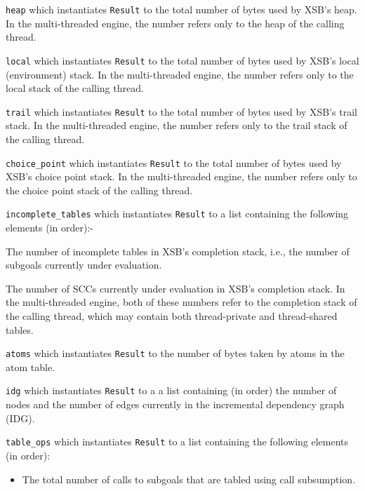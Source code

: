 \begin{description}
%
%
\item {\tt heap} which instantiates {\tt Result} to the total number
 of bytes used by XSB's heap.  In the multi-threaded engine, the
 number refers only to the heap of the calling thread.
%
\item {\tt local} which instantiates {\tt Result} to the total number
 of bytes used by XSB's local (environment) stack.  In the
 multi-threaded engine, the number refers only to the local stack of
 the calling thread.
%
\item {\tt trail} which instantiates {\tt Result} to the total number
 of bytes used by XSB's trail stack.  In the multi-threaded engine,
 the number refers only to the trail stack of the calling thread.
%
\item {\tt choice\_point} which instantiates {\tt Result} to the total
 number of bytes used by XSB's choice point stack.  In the
 multi-threaded engine, the number refers only to the choice point
 stack of the calling thread.
%
\item {\tt incomplete\_tables} which instantiates {\tt Result} to a
 list containing the following elements (in order):-
\bi
\item The number of incomplete tables in XSB's completion stack, i.e.,
 the number of subgoals currently under evaluation.
%
\item The number of SCCs currently under evaluation in XSB's
 completion stack.  
\ei 
In the multi-threaded engine, both of these numbers refer to the
 completion stack of the calling thread, which may contain both
 thread-private and thread-shared tables.
%
\item {\tt atoms} which instantiates {\tt Result} to the number of
 bytes taken by atoms in the atom table.
%
\item {\tt idg} which instantiates {\tt Result} to a a list containing
 (in order) the number of nodes and the number of edges currently in
 the incremental dependency graph (IDG).
%
\item {\tt table\_ops} which instantiates {\tt Result} to a list
 containing the following elements (in order):
\begin{itemize}
\item The total number of calls to subgoals that are tabled using call
 subsumption.


\end{itemize}
\end{description}
